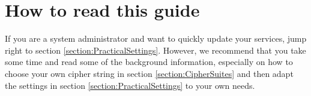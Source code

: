 \section{How to read this guide}

If you are a system administrator and want to quickly update your services, jump right to section \ref{section:PracticalSettings}. However, we recommend that you take some time and read some of the background information, especially on how to choose your own cipher string in section \ref{section:CipherSuites} and then adapt the settings in section \ref{section:PracticalSettings} to your own needs.



